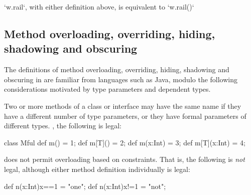 \xcd`w.rail`, with either definition above, 
is equivalent to 
\xcd`w.rail()`




\subsection{Method overloading, overriding, hiding, shadowing and obscuring}
\label{MethodOverload}



The definitions of method overloading, overriding, hiding, shadowing and
obscuring in \Xten{} are familiar from languages such as Java, modulo the
following considerations motivated by type parameters and dependent types.



Two or more methods of a class or interface may have the same
name if they have a different number of type parameters, or
they have formal parameters of different types.  \Eg, the following is legal: 

\begin{xten}
class Mful{
   def m() = 1;
   def m[T]() = 2;
   def m(x:Int) = 3;
   def m[T](x:Int) = 4;
}
\end{xten}
%

\XtenCurrVer{} does not permit overloading based on constraints. That is, the
following is {\em not} legal, although either method definition individually
is legal:
\begin{xten}
   def n(x:Int){x==1} = "one";
   def n(x:Int){x!=1} = "not";
\end{xten}



